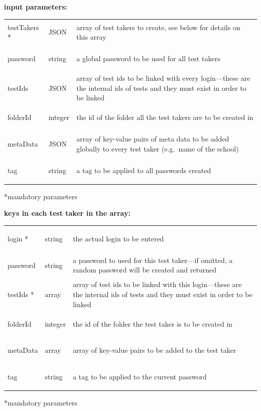 \documentclass[12pt]{article} %
\newenvironment{keyword}{\leavevmode\color{magenta}}{}
\newenvironment{parameters}
{
    \footnotesize\renewcommand{\arraystretch}{1.30}
    \renewcommand{\tabcolsep}{0pt}
    \begin{longtable}{>{\begin{keyword}}p{3cm}<{\end{keyword}}>{\begin{em}}p{1.5cm}<{\end{em}}p{12.5cm}}
        \hline
        }
        {
        \hline
    \end{longtable}\scriptsize\vspace{-5mm}*mandatory parameters\vspace{5mm}
}
\begin{document}
    \begin{minipage}{\textwidth}
        \textbf{input parameters:}
        \begin{parameters}
            testTakers * & JSON    & array of test takers to create, see below for details on this array                                                           \\
            password     & string  & a global password to be used for all test takers                                                                              \\
            testIds      & JSON    & array of test ids to be linked with every login—these are the internal ids of tests and they must exist in order to be linked \\
            folderId     & integer & the id of the folder all the test takers are to be created in                                                                 \\
            metaData     & JSON    & array of key-value pairs of meta data to be added globally to every test taker (e.g.\ name of the school)                     \\
            tag          & string  & a tag to be applied to all passwords created                                                                                  \\
        \end{parameters}
    \end{minipage}

    \begin{minipage}{\textwidth}
        \textbf{keys in each test taker in the array:}
        \begin{parameters}
            login *   & string  & the actual login to be entered                                                                                               \\
            password  & string  & a password to used for this test taker—if omitted, a random password will be created and returned                            \\
            testIds * & array   & array of test ids to be linked with this login—these are the internal ids of tests and they must exist in order to be linked \\
            folderId  & integer & the id of the folder the test taker is to be created in                                                                      \\
            metaData  & array   & array of key-value pairs to be added to the test taker                                                                       \\
            tag       & string  & a tag to be applied to the current password                                                                                  \\
        \end{parameters}
    \end{minipage}
\end{document}
